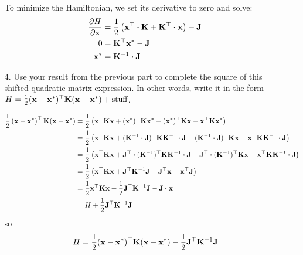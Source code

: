 \documentclass[a4paper,twoside]{article}
\begin{document}
\begin{itemize}
        \begin{problem}
            To minimize the Hamiltonian, we set its derivative to zero and solve:
            \begin{align}
                \pdv{H}{\vb{x}} &= \frac{1}{2} \left( \vb{x}^\top \vdot \vb{K} + \vb{K}^\top \vdot \vb{x} \right) - \vb{J} \\
                0 &= \vb{K}^\top \vb{x}^* - \vb{J} \\
                \vb{x}^* &= \vb{K}^{-1} \vdot \vb{J}
            \end{align}
        \end{problem}
    \item[4.] Use your result from the previous part to complete the square of this shifted quadratic matrix expression. In other words, write it in the form $ H = \frac{1}{2} (\vb{x} - \vb{x}^*)^\top \vb{K} (\vb{x} - \vb{x}^*) + \text{stuff} $.
        \begin{problem}
            \begin{align}
                \frac{1}{2} \left( \vb{x} - \vb{x}^* \right)^\top \vb{K} (\vb{x} - \vb{x}^*) &= \frac{1}{2}\left( \vb{x}^\top \vb{K} \vb{x} + (\vb{x}^*)^\top \vb{K} \vb{x}^* - (\vb{x}^*)^\top \vb{K} \vb{x} - \vb{x}^\top \vb{K} \vb{x}^*\right) \\
                &= \frac{1}{2} \left( \vb{x}^\top \vb{K} \vb{x} + (\vb{K}^{-1} \vdot \vb{J})^\top \vb{K} \vb{K}^{-1} \vdot \vb{J} - (\vb{K}^{-1} \vdot \vb{J})^\top \vb{K} \vb{x} - \vb{x}^\top \vb{K} \vb{K}^{-1} \vdot \vb{J} \right) \\
                &= \frac{1}{2} \left( \vb{x}^\top \vb{K} \vb{x} + \vb{J}^\top \vdot (\vb{K}^{-1})^\top \vb{K} \vb{K}^{-1} \vdot \vb{J} - \vb{J}^\top \vdot (\vb{K}^{-1})^\top \vb{K} \vb{x} - \vb{x}^\top \vb{K} \vb{K}^{-1} \vdot \vb{J} \right) \\
                &= \frac{1}{2} \left( \vb{x}^\top \vb{K} \vb{x} + \vb{J}^\top \vb{K}^{-1} \vb{J} - \vb{J}^\top \vb{x} - \vb{x}^\top \vb{J} \right) \\
                &= \frac{1}{2} \vb{x}^\top \vb{K} \vb{x} + \frac{1}{2} \vb{J}^\top \vb{K}^{-1} \vb{J} - \vb{J} \vdot \vb{x} \\
                &= H + \frac{1}{2} \vb{J}^\top \vb{K}^{-1} \vb{J}
            \end{align}
            so
            \begin{equation}
                H = \frac{1}{2} (\vb{x} - \vb{x}^*)^\top \vb{K} (\vb{x} - \vb{x}^*) - \frac{1}{2} \vb{J}^\top \vb{K}^{-1} \vb{J}

\end{equation}
\end{problem}
\end{itemize}
\end{document}
